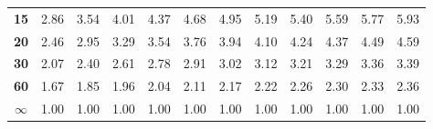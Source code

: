 \begin{center}
\begin{tabular}{c|c|c|c|c|c|c|c|c|c|c|c}
\textbf{15}    & 2.86 & 3.54 & 4.01 & 4.37 & 4.68 & 4.95 & 5.19 & 5.40 & 5.59 & 5.77 & 5.93 \bstrut\tstrut\\
\textbf{20}    & 2.46 & 2.95 & 3.29 & 3.54 & 3.76 & 3.94 & 4.10 & 4.24 & 4.37 & 4.49 & 4.59 \bstrut\tstrut\\
\textbf{30}    & 2.07 & 2.40 & 2.61 & 2.78 & 2.91 & 3.02 & 3.12 & 3.21 & 3.29 & 3.36 & 3.39 \bstrut\tstrut\\
\textbf{60}    & 1.67 & 1.85 & 1.96 & 2.04 & 2.11 & 2.17 & 2.22 & 2.26 & 2.30 & 2.33 & 2.36 \bstrut\tstrut\\
$\infty$      & 1.00 & 1.00 & 1.00 & 1.00 & 1.00 & 1.00 & 1.00 & 1.00 & 1.00 & 1.00 & 1.00 \bstrut\tstrut\\
\hline
\end{tabular}
\end{center}
